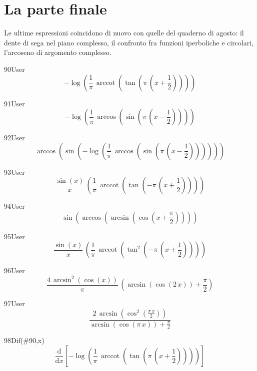 \section{La parte finale}

Le ultime espressioni coincidono di nuovo con quelle del quaderno di agosto: il dente di sega nel piano complesso, il confronto fra funzioni iperboliche e circolari, l'arcoseno di argomento complesso.

\begin{espr}{90}{User}{}
\[
-\log\!\left(\frac{1}{\pi}\, \operatorname{arccot}\!\left(\tan\!\left(\pi\, \left(x + \frac{1}{2}\right)\right)\right)\right)
\]
\end{espr}
\begin{espr}{91}{User}{}
\[
-\log\!\left(\frac{1}{\pi}\, \arccos\!\left(\sin\!\left(\pi\, \left(x - \frac{1}{2}\right)\right)\right)\right)
\]
\end{espr}
\begin{espr}{92}{User}{}
\[
\arccos\!\left(\sin\!\left(-\log\!\left(\frac{1}{\pi}\, \arccos\!\left(\sin\!\left(\pi\, \left(x - \frac{1}{2}\right)\right)\right)\right)\right)\right)
\]
\end{espr}
\begin{espr}{93}{User}{}
\[
\frac{\sin\!\left(x\right)}{x}\, \left(\frac{1}{\pi}\, \operatorname{arccot}\!\left(\tan\!\left(-\pi\, \left(x + \frac{1}{2}\right)\right)\right)\right)
\]
\end{espr}
\begin{espr}{94}{User}{}
\[
\sin\!\left(\arccos\!\left(\arcsin\!\left(\cos\!\left(x + \frac{\pi}{2}\right)\right)\right)\right)
\]
\end{espr}
\begin{espr}{95}{User}{}
\[
\frac{\sin\!\left(x\right)}{x}\, \left(\frac{1}{\pi}\, \operatorname{arccot}\!\left(\tan^{2}\!\left(-\pi\, \left(x + \frac{1}{2}\right)\right)\right)\right)
\]
\end{espr}
\begin{espr}{96}{User}{}
\[
\frac{4\, \arcsin^{2}\!\left(\cos\!\left(x\right)\right)}{\pi}\, \left(\arcsin\!\left(\cos\!\left(2\, x\right)\right) + \frac{\pi}{2}\right)
\]
\end{espr}
\begin{espr}{97}{User}{}
\[
\frac{2\, \arcsin\!\left(\cos^{2}\!\left(\frac{\pi\, x}{2}\right)\right)}{\arcsin\!\left(\cos\!\left(\pi\, x\right)\right) + \frac{\pi}{2}}
\]
\end{espr}
\begin{espr}{98}{Dif(\#90,x)}{}
\[
\frac{\mathrm{d}}{\mathrm{d}x}\!\left[-\log\!\left(\frac{1}{\pi}\, \operatorname{arccot}\!\left(\tan\!\left(\pi\, \left(x + \frac{1}{2}\right)\right)\right)\right)\right]
\]
\end{espr}
